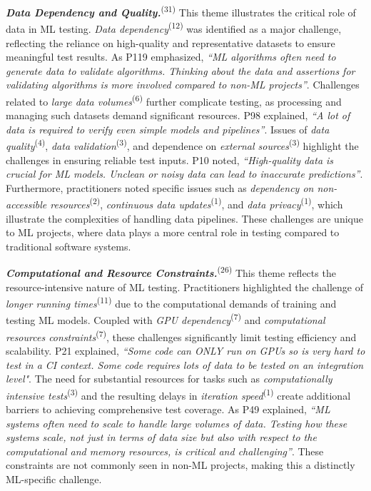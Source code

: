 \textbf{\textit{Data Dependency and Quality.}}\textsuperscript{(31)}
This theme illustrates the critical role of data in ML testing. \textit{Data dependency}\textsuperscript{(12)} was identified as a major challenge, reflecting the reliance on high-quality and representative datasets to ensure meaningful test results. 
As P119 emphasized, \textit{``ML algorithms often need to generate data to validate algorithms. Thinking about the data and assertions for validating algorithms is more involved compared to non-ML projects''}.
Challenges related to \textit{large data volumes}\textsuperscript{(6)} further complicate testing, as processing and managing such datasets demand significant resources. P98 explained, \textit{``A lot of data is required to verify even simple models and pipelines''}.
Issues of \textit{data quality}\textsuperscript{(4)}, \textit{data validation}\textsuperscript{(3)}, and dependence on \textit{external sources}\textsuperscript{(3)} highlight the challenges in ensuring reliable test inputs. 
P10 noted, \textit{``High-quality data is crucial for ML models. Unclean or noisy data can lead to inaccurate predictions''}.
Furthermore, practitioners noted specific issues such as \textit{dependency on non-accessible resources}\textsuperscript{(2)}, \textit{continuous data updates}\textsuperscript{(1)}, and \textit{data privacy}\textsuperscript{(1)}, which illustrate the complexities of handling data pipelines. These challenges are unique to ML projects, where data plays a more central role in testing compared to traditional software systems.

\textbf{\textit{Computational and Resource Constraints.}}\textsuperscript{(26)}
This theme reflects the resource-intensive nature of ML testing. Practitioners highlighted the challenge of \textit{longer running times}\textsuperscript{(11)} due to the computational demands of training and testing ML models. Coupled with \textit{GPU dependency}\textsuperscript{(7)} and \textit{computational resources constraints}\textsuperscript{(7)}, these challenges significantly limit testing efficiency and scalability.
P21 explained, \textit{``Some code can ONLY run on GPUs so is very hard to test in a CI context. Some code requires lots of data to be tested on an integration level"}.
The need for substantial resources for tasks such as \textit{computationally intensive tests}\textsuperscript{(3)} and the resulting delays in \textit{iteration speed}\textsuperscript{(1)} create additional barriers to achieving comprehensive test coverage. 
As P49 explained, \textit{``ML systems often need to scale to handle large volumes of data. Testing how these systems scale, not just in terms of data size but also with respect to the computational and memory resources, is critical and challenging''}.
These constraints are not commonly seen in non-ML projects, making this a distinctly ML-specific challenge.

